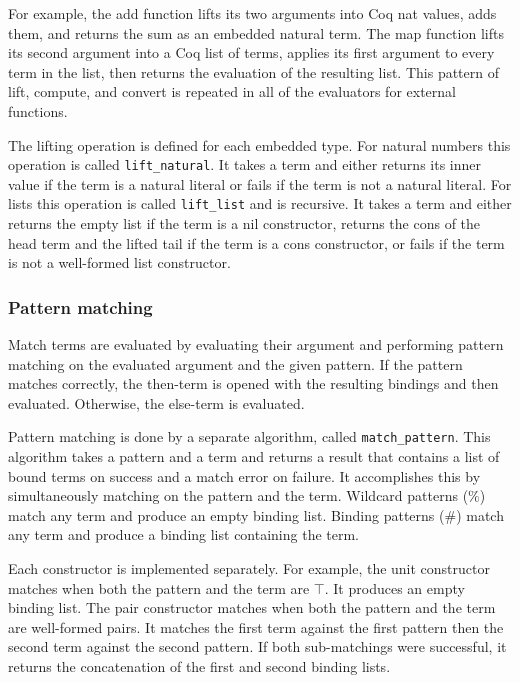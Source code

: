 \documentclass[12pt]{article}
\begin{document}
For example, the add function lifts its two arguments into Coq nat
values, adds them, and returns the sum as an embedded natural term.  The
map function lifts its second argument into a Coq list of terms, applies
its first argument to every term in the list, then returns the
evaluation of the resulting list.  This pattern of lift, compute, and
convert is repeated in all of the evaluators for external functions.

The lifting operation is defined for each embedded type.  For natural
numbers this operation is called \texttt{lift\_natural}.  It takes a
term and either returns its inner value if the term is a natural literal
or fails if the term is not a natural literal.  For lists this operation
is called \texttt{lift\_list} and is recursive.  It takes a term and
either returns the empty list if the term is a nil constructor, returns
the cons of the head term and the lifted tail if the term is a cons
constructor, or fails if the term is not a well-formed list constructor.

\subsubsection{Pattern matching}

Match terms are evaluated by evaluating their argument and performing
pattern matching on the evaluated argument and the given pattern.  If
the pattern matches correctly, the then-term is opened with the
resulting bindings and then evaluated.  Otherwise, the else-term is
evaluated.

Pattern matching is done by a separate algorithm, called
\texttt{match\_pattern}.  This algorithm takes a pattern and a term and
returns a result that contains a list of bound terms on success and a
match error on failure.  It accomplishes this by simultaneously matching
on the pattern and the term.  Wildcard patterns ($\%$) match any term and
produce an empty binding list.  Binding patterns ($\#$) match any term
and produce a binding list containing the term.

Each constructor is implemented separately.  For example, the unit
constructor matches when both the pattern and the term are $\top$.  It
produces an empty binding list.  The pair constructor matches when both
the pattern and the term are well-formed pairs.  It matches the first
term against the first pattern then the second term against the second
pattern.  If both sub-matchings were successful, it returns the
concatenation of the first and second binding lists.
\end{document}
